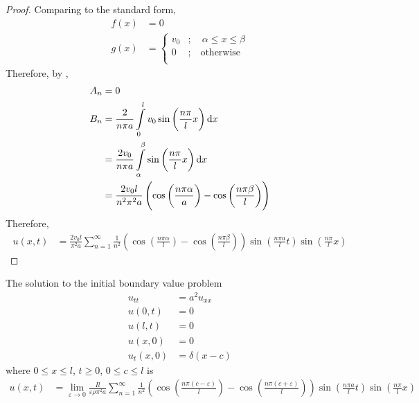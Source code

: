 \documentclass[titlepage, fleqn, a4paper, 12pt, twoside]{article}
\theoremstyle{definition}
\theoremstyle{theorem}
\begin{document}
\begin{proof}
	Comparing to the standard form,
	\begin{align*}
		f(x) &= 0\\
		g(x) &=
			\begin{cases}
				v_0 & ;\quad \alpha \le x \le \beta \\
				0   & ;\quad \text{otherwise}       \\
			\end{cases}
	\end{align*}
	Therefore, by ,
	\begin{align*}
		A_n & = 0                                                                                              \\
		B_n & = \frac{2}{n \pi a} \int\limits_{0}^{l} v_0 \sin\left( \frac{n \pi}{l} x \right) \dif x          \\
                    & = \frac{2 v_0}{n \pi a} \int\limits_{\alpha}^{\beta} \sin\left( \frac{n \pi}{l} x \right) \dif x \\
                    & = \frac{2 v_0 l}{n^2 \pi^2 a} \left( \cos\left( \frac{n \pi \alpha}{a} \right) - \cos\left( \frac{n \pi \beta}{l} \right) \right)
	\end{align*}
	Therefore,
	\begin{align*}
		u(x,t) & = \frac{2 v_0 l}{\pi^2 a} \sum\limits_{n = 1}^{\infty} \frac{1}{n^2} \left( \cos\left( \frac{n \pi \alpha}{l} \right) - \cos\left( \frac{n \pi \beta}{l} \right) \right) \sin\left( \frac{n \pi a}{l} t \right) \sin\left( \frac{n \pi}{l} x \right)
	\end{align*}
\end{proof}

The solution to the initial boundary value problem
\begin{align*}
	u_{t t}  & = a^2 u_{x x} \\
	u(0,t)   & = 0           \\
	u(l,t)   & = 0           \\
	u(x,0)   & = 0           \\
	u_t(x,0) & = \delta(x - c)
\end{align*}
where $0 \le x \le l$, $t \ge 0$, $0 \le c \le l$ is
\begin{align*}
	u(x,t) & = \lim\limits_{\varepsilon \to 0} \frac{I l}{\varepsilon \rho \pi^2 a} \sum\limits_{n = 1}^{\infty} \frac{1}{n^2} \left( \cos\left( \frac{n \pi (c - \varepsilon)}{l} \right) - \cos\left( \frac{n \pi (c + \varepsilon)}{l} \right) \right) \sin\left( \frac{n \pi a}{l} t \right) \sin\left( \frac{n \pi}{l} x \right)
\end{align*}
\end{document}
